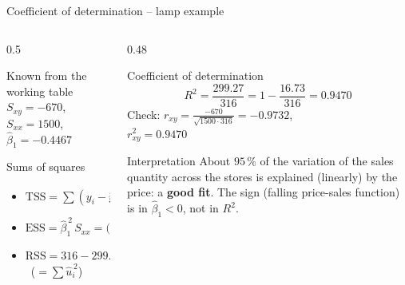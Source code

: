 \documentclass[aspectratio=169,11pt]{beamer}
\newcommand{\minlineskip}{%
  \setlength{\lineskiplimit}{2pt}\setlength{\lineskip}{2pt}%
  \setlength{\normallineskiplimit}{2pt}\setlength{\normallineskip}{2pt}}
\begin{document}
\begin{frame}{Coefficient of determination -- lamp example}
  \begin{columns}[T]
    \begin{column}{0.5\textwidth}
      \small\minlineskip
      \begin{block}{Known from the working table}
        $S_{xy} = -670$, \quad $S_{xx} = 1500$, \quad $\hat{\beta}_1 = -0.4467$
      \end{block}
      \begin{block}{Sums of squares}
        \begin{itemize}
          \item $\text{TSS} = \sum (y_i - \bar{y})^{2} = 10^{2} + 7^{2} + \ldots + (-8)^{2} = 316$
          \item $\text{ESS} = \hat{\beta}_1^{\,2}\, S_{xx} = \bigl(\tfrac{-670}{1500}\bigr)^{2} \cdot 1500 = 299.27$
          \item $\text{RSS} = 316 - 299.27 = 16.73$ \ ($=\sum\hat u_i^{\,2}$)
        \end{itemize}
      \end{block}
    \end{column}
    \begin{column}{0.48\textwidth}
      \small
      \begin{exampleblock}{Coefficient of determination}
        \[
          R^{2} = \frac{299.27}{316} = 1 - \frac{16.73}{316} = \mathbf{0.9470}
        \]
        Check: $r_{xy} = \frac{-670}{\sqrt{1500 \cdot 316}} = -0.9732$,\\
        $r_{xy}^{2} = 0.9470$ \checkmark
      \end{exampleblock}
      \begin{alertblock}{Interpretation}
        About $95\,\%$ of the variation of the sales quantity across the
        stores is explained (linearly) by the price: a \textbf{good fit}. The
        sign (falling price-sales function) is in $\hat{\beta}_1 < 0$, not in
        $R^{2}$.
      \end{alertblock}
    \end{column}
  \end{columns}
\end{frame}
\end{document}
